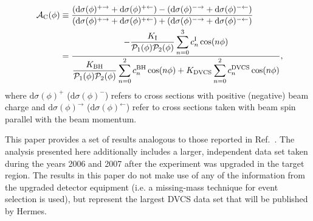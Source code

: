 \begin{align}
\hspace{0.5cm}\mathcal{A}_{\textrm{C}}(\phi) &\equiv  
\frac{(\textrm{d}\sigma(\phi)^{+\rightarrow} +
\textrm{d}\sigma(\phi)^{+\leftarrow}) -
(\textrm{d}\sigma(\phi)^{-\rightarrow}
+ \textrm{d}\sigma(\phi)^{-\leftarrow})}{(\textrm{d}\sigma(\phi)^{+\rightarrow}
+
\textrm{d}\sigma(\phi)^{+\leftarrow}) +
(\textrm{d}\sigma(\phi)^{-\rightarrow}
+ \textrm{d}\sigma(\phi)^{-\leftarrow})}&    \nonumber \\
&=\dfrac{{-\dfrac{K_{\textrm{I}}}{\mathcal{P}_{1}(\phi)\mathcal{P}_{2}(\phi)}
\displaystyle\sum_{n=0}^3
c_{n}^{\textrm{I}}\cos(n\phi)}}{\dfrac{K_{\textrm{BH}}}{\mathcal{P}_{1}
(\phi)\mathcal{P}_
{2}(\phi)}
\displaystyle\sum_{n=0}^2
c_{n}^{\textrm{BH}}\cos(n\phi) + 
K_{\textrm{DVCS}}\displaystyle\sum_{n=0}^2 c_{n}^{\textrm{DVCS}}\cos(n\phi)} ,&
\label{e:ac}
\end{align}
where $\textrm{d}\sigma(\phi)^+$ ($\textrm{d}\sigma(\phi)^-$) refers to
cross sections with positive (negative) beam charge and
$\textrm{d}\sigma(\phi)^\rightarrow$ ($\textrm{d}\sigma(\phi)^\leftarrow$) refer
to cross sections taken with beam spin parallel  with the
beam momentum.

This paper provides a set of results analogous to those reported in
Ref.~\cite{Air09}. The analysis presented here additionally includes a larger, independent data set taken during the years 2006 and 2007 after the experiment was upgraded in the target region. 
The results in this paper do not make use of any of the information from the
upgraded detector equipment (i.e. a missing-mass technique for event selection is used), but represent the largest DVCS data set that will
be published by H{\sc ermes}.
